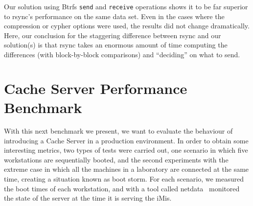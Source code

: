 Our solution using Btrfs \texttt{send} and \texttt{receive} operations shows it to be far superior to rsync’s performance on the same data set. Even in the cases where the compression or cypher options were used, the results did not change dramatically. Here, our conclusion for the staggering difference between rsync and our solution(s) is that rsync takes an enormous amount of time computing the differences (with block-by-block comparisons) and “deciding” on what to send.






\section{Cache Server Performance Benchmark}
\label{sub:eval_cache_bench}

With this next benchmark we present, we want to evaluate the behaviour of introducing a Cache Server in a production environment. In order to obtain some interesting metrics, two types of tests were carried out, one scenario in which five workstations are sequentially booted, and the second experiments with the extreme case in which all the machines in a laboratory are connected at the same time, creating a situation known as boot storm. For each scenario, we measured the boot times of each workstation, and with a tool called netdata~\cite{netdata} monitored the state of the server at the time it is serving the iMis.

